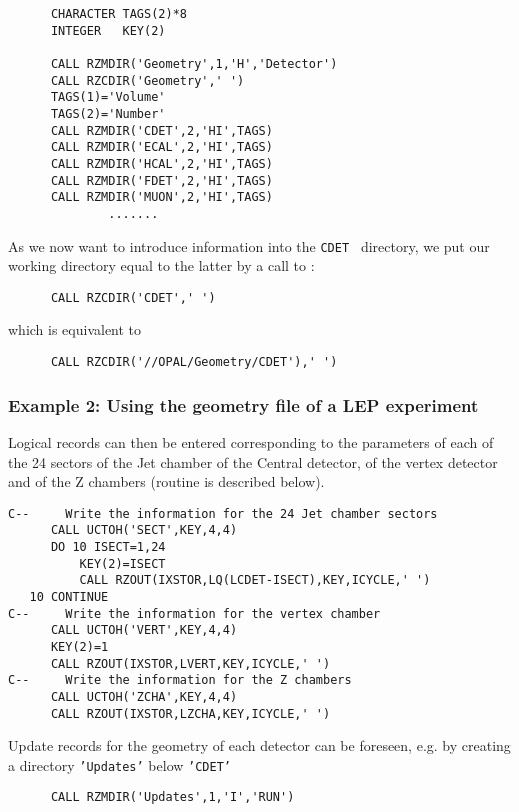 \begin{verbatim}
      CHARACTER TAGS(2)*8
      INTEGER   KEY(2)
 
      CALL RZMDIR('Geometry',1,'H','Detector')
      CALL RZCDIR('Geometry',' ')
      TAGS(1)='Volume'
      TAGS(2)='Number'
      CALL RZMDIR('CDET',2,'HI',TAGS)
      CALL RZMDIR('ECAL',2,'HI',TAGS)
      CALL RZMDIR('HCAL',2,'HI',TAGS)
      CALL RZMDIR('FDET',2,'HI',TAGS)
      CALL RZMDIR('MUON',2,'HI',TAGS)
              .......
\end{verbatim}

As we now want to introduce information into the {\tt CDET } directory,
we put our working directory equal to the latter by a call to :

\begin{verbatim}
      CALL RZCDIR('CDET',' ')
\end{verbatim}

which is equivalent to

\begin{verbatim}
      CALL RZCDIR('//OPAL/Geometry/CDET'),' ')
\end{verbatim}

\subsubsection*{Example 2: Using the geometry file of a LEP experiment}

Logical records can then be entered corresponding to the parameters
of each of the 24 sectors of the Jet chamber of the Central detector,
of the vertex detector and of the Z chambers
(routine  is described below).

\begin{verbatim}
C--     Write the information for the 24 Jet chamber sectors
      CALL UCTOH('SECT',KEY,4,4)
      DO 10 ISECT=1,24
          KEY(2)=ISECT
          CALL RZOUT(IXSTOR,LQ(LCDET-ISECT),KEY,ICYCLE,' ')
   10 CONTINUE
C--     Write the information for the vertex chamber
      CALL UCTOH('VERT',KEY,4,4)
      KEY(2)=1
      CALL RZOUT(IXSTOR,LVERT,KEY,ICYCLE,' ')
C--     Write the information for the Z chambers
      CALL UCTOH('ZCHA',KEY,4,4)
      CALL RZOUT(IXSTOR,LZCHA,KEY,ICYCLE,' ')
\end{verbatim}

Update records for the geometry of each detector can be foreseen, e.g.
by creating a directory {\tt'Updates'} below {\tt'CDET'}

\begin{verbatim}
      CALL RZMDIR('Updates',1,'I','RUN')
\end{verbatim}


